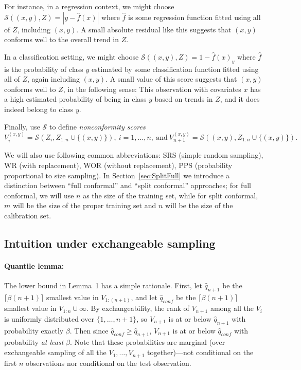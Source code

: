\documentclass[10.5pt, letterpaper]{article}
\numberwithin{table}{section}
\numberwithin{figure}{section}
\numberwithin{equation}{section}
\begin{document}
For instance, in a regression context, we might choose
$\mathcal{S}\left((x,y),Z\right) = |y-\hat{f}(x)|$ where $\hat f$ is some regression function fitted using all of $Z$, including $(x,y)$. A small absolute residual like this suggests that $(x,y)$ conforms well to the overall trend in $Z$.

In a classification setting, we might choose $\mathcal{S}\left((x,y),Z\right) = 1-\hat{f}(x)_y$ where $\hat f$ is the probability of class $y$ estimated by some classification function fitted using all of $Z$, again including $(x,y)$. A small value of this score suggests that $(x,y)$ conforms well to $Z$, in the following sense: This observation with covariates $x$ has a high estimated probability of being in class $y$ based on trends in $Z$, and it does indeed belong to class $y$.

Finally, use $\mathcal S$ to define \emph{nonconformity scores}
\begin{equation}\label{eqn:Tibs3}
V_i^{(x,y)} = \mathcal{S}\left(Z_i,Z_{1{:}n} \cup \{(x,y)\}\right),\ i=1,\ldots,n,
\ \mathrm{and} \
V_{n+1}^{(x,y)} = \mathcal{S}\left((x,y), Z_{1{:}n}\cup\{(x,y)\}\right).
\end{equation}

We will also use following common abbreviations: SRS (simple random sampling), WR (with replacement), WOR (without replacement), PPS (probability proportional to size sampling). In Section~\ref{sec:SplitFull} we introduce a distinction between ``full conformal'' and ``split conformal'' approaches; for full conformal, we will use $n$ as the size of the training set, while for split conformal, $m$ will be the size of the proper training set and $n$ will be the size of the calibration set.




\subsection{Intuition under exchangeable sampling}\label{sec:IntuitionIid}

\paragraph{Quantile lemma:} The lower bound in Lemma~1 has a simple rationale. First, let $\hat q_{n+1}$ be the $\lceil \beta (n+1) \rceil$ smallest value in $V_{1{:}{(n+1)}}$, and let $\hat q_{conf}$ be the $\lceil \beta (n+1) \rceil$ smallest value in $V_{1{:}n}\cup\infty$.
By exchangeability, the rank of $V_{n+1}$ among all the $V_i$ is uniformly distributed over $\{1,\ldots,n+1\}$, so $V_{n+1}$ is at or below $\hat q_{n+1}$ with probability exactly $\beta$.
Then since $\hat q_{conf} \geq \hat q_{n+1}$, $V_{n+1}$ is at or below $\hat q_{conf}$ with probability \emph{at least} $\beta$. Note that these probabilities are marginal (over exchangeable sampling of all the $V_1,\ldots,V_{n+1}$ together)---not conditional on the first $n$ observations nor conditional on the test observation.
\end{document}

